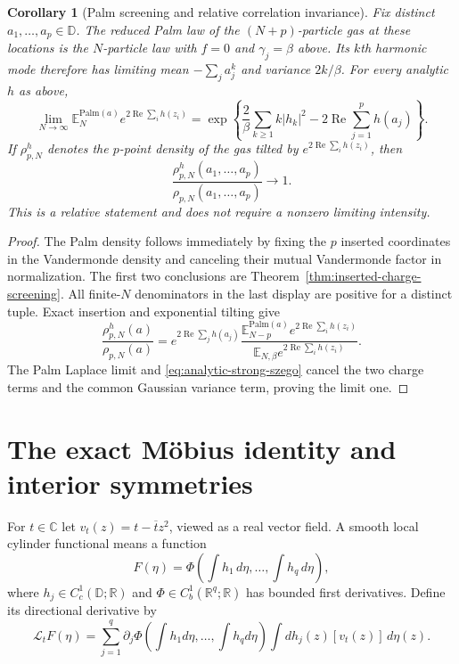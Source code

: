 \documentclass[11pt,a4paper]{article}
\numberwithin{equation}{section}
\newtheorem{corollary}[theorem]{Corollary}
\theoremstyle{definition}
\theoremstyle{remark}
\newcommand{\D}{\mathbb D}
\newcommand{\C}{\mathbb C}
\newcommand{\R}{\mathbb R}
\begin{document}
\begin{corollary}[Palm screening and relative correlation invariance]
\label{cor:palm-screening-relative-invariance}
Fix distinct $a_1,\ldots,a_p\in\D$. The reduced Palm law of the
$(N+p)$-particle gas at these locations is the $N$-particle law with
$f=0$ and $\gamma_j=\beta$ above. Its $k$th harmonic mode therefore
has limiting mean $-\sum_j a_j^k$ and variance $2k/\beta$.
For every analytic $h$ as above,
\[
 \lim_{N\to\infty}\mathbb E_N^{\mathrm{Palm}(a)}
       e^{2\operatorname{Re}\sum_i h(z_i)}
 =\exp\left\{\frac2\beta\sum_{k\geq1}k|h_k|^2
                     -2\operatorname{Re}\sum_{j=1}^p h(a_j)\right\}.
\]
If $\rho_{p,N}^h$ denotes the $p$-point density of the gas tilted by
$e^{2\operatorname{Re}\sum_i h(z_i)}$, then
\[
 \frac{\rho_{p,N}^h(a_1,\ldots,a_p)}
      {\rho_{p,N}(a_1,\ldots,a_p)}\longrightarrow1.
\]
This is a relative statement and does not require a nonzero limiting
intensity.
\end{corollary}

\begin{proof}
The Palm density follows immediately by fixing the $p$ inserted
coordinates in the Vandermonde density and canceling their mutual
Vandermonde factor in normalization. The first two conclusions are
Theorem~\ref{thm:inserted-charge-screening}. All finite-$N$ denominators
in the last display are positive for a distinct tuple. Exact insertion
and exponential tilting give
\[
 \frac{\rho_{p,N}^h(a)}{\rho_{p,N}(a)}
 =e^{2\operatorname{Re}\sum_jh(a_j)}
   \frac{\mathbb E_{N-p}^{\mathrm{Palm}(a)}
                    e^{2\operatorname{Re}\sum_i h(z_i)}}
        {\mathbb E_{N,\beta}e^{2\operatorname{Re}\sum_i h(z_i)}}.
\]
The Palm Laplace limit and
\eqref{eq:analytic-strong-szego} cancel the two charge terms and the
common Gaussian variance term, proving the limit one.
\end{proof}

\section{The exact M\"obius identity and interior symmetries}
\label{sec:mobius-ward-interior}

For $t\in\C$ let $v_t(z)=t-\overline t z^2$, viewed as a real vector
field. A smooth local cylinder functional means a function
\[
 F(\eta)=\Phi\left(\int h_1\,d\eta,\ldots,\int h_q\,d\eta\right),
\]
where $h_j\in C_c^1(\D;\R)$ and $\Phi\in C_b^1(\R^q;\R)$ has bounded
first derivatives. Define its directional derivative by
\[
 \mathcal L_tF(\eta)
 =\sum_{j=1}^q\partial_j\Phi\left(\int h_1d\eta,\ldots,\int h_qd\eta\right)
       \int dh_j(z)[v_t(z)]\,d\eta(z).
\]
\end{document}
